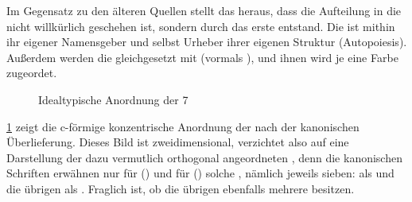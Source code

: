 Im Gegensatz zu den älteren Quellen stellt das  heraus, dass die Aufteilung in die  nicht willkürlich geschehen ist, sondern durch das erste  entstand. Die  ist mithin ihr eigener Namensgeber und selbst Urheber ihrer eigenen Struktur (Autopoiesis). Außerdem werden die  gleichgesetzt mit  (vormals ), und ihnen wird je eine Farbe zugeordet.

\begin{figure}[ht!]
    \centering
    
    \caption{Idealtypische Anordnung der 7 }
    \label{fig:ringconvention}
\end{figure}

\cref{fig:ringconvention} zeigt die c-förmige konzentrische Anordnung der  nach der kanonischen Überlieferung. Dieses Bild ist zweidimensional, verzichtet also auf eine Darstellung der dazu vermutlich orthogonal angeordneten , denn die kanonischen Schriften erwähnen nur für  () und für  () solche , nämlich jeweils sieben:  als  und die übrigen als  \cite{cbasestarbasemanual}. Fraglich ist, ob die übrigen  ebenfalls mehrere  besitzen.
        
